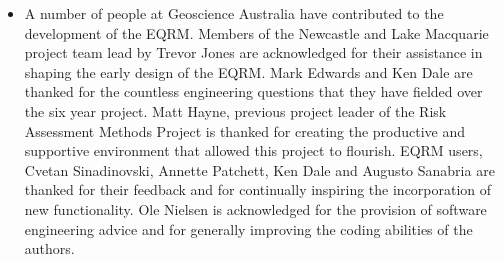\documentclass{article}
\begin{document}
\begin{itemize}
\item A number of people at Geoscience Australia have contributed
 to the development of the EQRM. Members of the Newcastle
and Lake Macquarie project team lead by Trevor Jones are
acknowledged for their assistance in shaping the early design of the
EQRM. Mark Edwards and Ken Dale are thanked for the countless
engineering questions that they have fielded over the six year
project. Matt Hayne, previous project leader of the Risk Assessment
Methods Project is thanked for creating the productive and
supportive environment that allowed this project to flourish. EQRM
users, Cvetan Sinadinovski, Annette Patchett, Ken Dale and Augusto
Sanabria are thanked for their feedback and for continually
inspiring the incorporation of new functionality. Ole Nielsen is
acknowledged for the provision of software engineering advice and
for generally improving the coding abilities of the authors.
\end{itemize}
\end{document}
